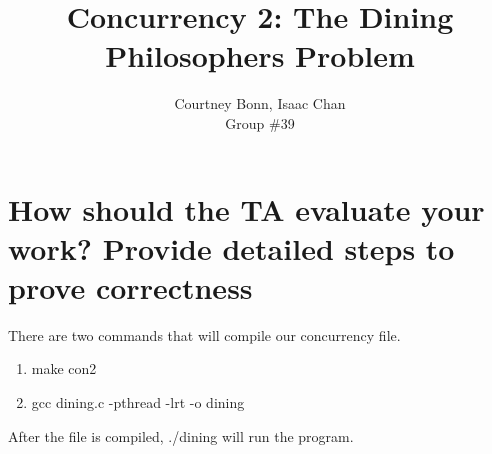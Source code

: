 \documentclass[letterpaper,10pt,draftclsnofoot,onecolumn,titlepage]{IEEEtran}
\def\name{Courtney Bonn, Isaac Chan}
\def\grp{Group \#39}
\begin{document}
\title{Concurrency 2: The Dining Philosophers Problem}
\author{\name \\ \grp}

\maketitle


\section{ How should the TA evaluate your work? Provide detailed steps to prove correctness} 

There are two commands that will compile our concurrency file. 

\begin{enumerate}
	\item make con2
	\item gcc dining.c -pthread -lrt -o dining
\end{enumerate}

After the file is compiled, ./dining will run the program. 
\end{document}
